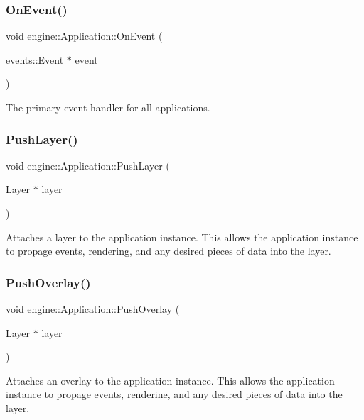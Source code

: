 \subsubsection{\texorpdfstring{On\+Event()}{OnEvent()}}
{\footnotesize\ttfamily void engine\+::\+Application\+::\+On\+Event (\begin{DoxyParamCaption}\item[{\hyperlink{classengine_1_1events_1_1Event}{events\+::\+Event} $\ast$}]{event }\end{DoxyParamCaption})}

The primary event handler for all applications. \mbox{\label{classengine_1_1Application_adb129a86a6cdbd80b25094d08605d213}} 
\subsubsection{\texorpdfstring{Push\+Layer()}{PushLayer()}}
{\footnotesize\ttfamily void engine\+::\+Application\+::\+Push\+Layer (\begin{DoxyParamCaption}\item[{\hyperlink{classengine_1_1Layer}{Layer} $\ast$}]{layer }\end{DoxyParamCaption})}

Attaches a layer to the application instance. This allows the application instance to propage events, rendering, and any desired pieces of data into the layer. \mbox{\label{classengine_1_1Application_a00041c455b5699665d21662be95abd85}} 
\subsubsection{\texorpdfstring{Push\+Overlay()}{PushOverlay()}}
{\footnotesize\ttfamily void engine\+::\+Application\+::\+Push\+Overlay (\begin{DoxyParamCaption}\item[{\hyperlink{classengine_1_1Layer}{Layer} $\ast$}]{layer }\end{DoxyParamCaption})}

Attaches an overlay to the application instance. This allows the application instance to propage events, renderine, and any desired pieces of data into the layer. \mbox{\label{classengine_1_1Application_a4dcdf08d920f7f63013a25cb1e80438b}} 
